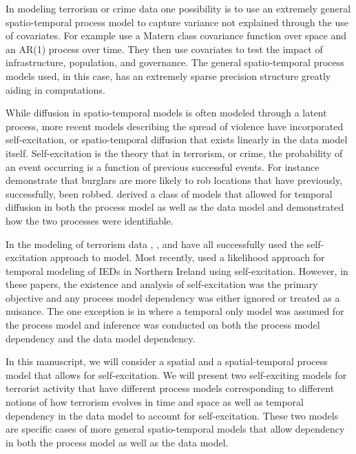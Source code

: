 \documentclass[11pt]{isuthesis}
\begin{document}
In modeling terrorism or crime data one possibility is to use an extremely general spatio-temporal process model to capture variance not explained through the use of covariates.  For example \cite{python2016bayesian} use a Matern class covariance function over space and an AR(1) process over time.  They then use covariates to test the impact of infrastructure, population, and governance.  The general spatio-temporal process models used, in this case, has an extremely sparse precision structure greatly aiding in computations.

While diffusion in spatio-temporal models is often modeled through a latent process, more recent models describing the spread of violence have incorporated self-excitation, or spatio-temporal diffusion that exists linearly in the data model itself.  Self-excitation is the theory that in terrorism, or crime, the probability of an event occurring is a function of previous successful events.  For instance \cite{mohler2011self} demonstrate that burglars are more likely to rob locations that have previously, successfully, been robbed.  \cite{mohler2013modeling} derived a class of models that allowed for temporal diffusion in both the process model as well as the data model and demonstrated how the two processes were identifiable.

In the modeling of terrorism data \cite{lewis2012self}, \cite{porter2012self}, and \cite{mohler2013modeling} have all successfully used the self-excitation approach to model.  Most recently, \cite{tench2016spatio} used a likelihood approach for temporal modeling of IEDs in Northern Ireland using self-excitation.  However, in these papers, the existence and analysis of self-excitation was the primary objective and any process model dependency was either ignored or treated as a nuisance.  The one exception is in \cite{mohler2013modeling} where a temporal only model was assumed for the process model and inference was conducted on both the process model dependency and the data model dependency.

In this manuscript, we will consider a spatial and a spatial-temporal process model that allows for self-excitation.  We will present two self-exciting models for terrorist activity that have different process models corresponding to different notions of how terrorism evolves in time and space as well as temporal dependency in the data model to account for self-excitation.  These two models are specific cases of more general spatio-temporal models that allow dependency in both the process model as well as the data model.
\end{document}
